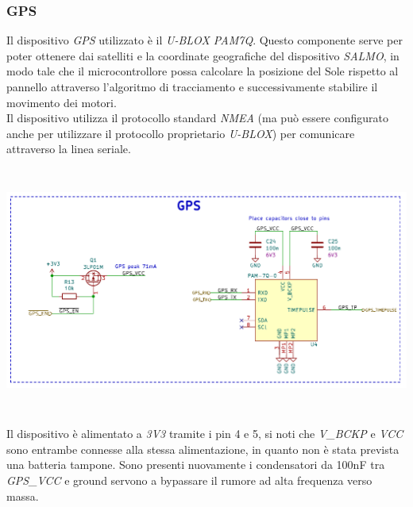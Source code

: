 \hypertarget{gps}{%
\subsubsection{\texorpdfstring{\hfill\break
\hfill\break
GPS }{  GPS }}\label{gps}}

Il dispositivo \emph{GPS} utilizzato è il \emph{U-BLOX PAM7Q}. Questo
componente serve per poter ottenere dai satelliti e la coordinate
geografiche del dispositivo \emph{SALMO}, in modo tale che il
microcontrollore possa calcolare la posizione del Sole rispetto al
pannello attraverso l'algoritmo di tracciamento e successivamente
stabilire il movimento dei motori.\\
Il dispositivo utilizza il protocollo standard \emph{NMEA} (ma può
essere configurato anche per utilizzare il protocollo proprietario
\emph{U-BLOX}) per comunicare attraverso la linea seriale.

\begin{center}
\includegraphics[width=6.5in,height=3.19444in]{figures/image26.png}
\captionsetup{type=figure}
\end{center}

Il dispositivo è alimentato a \emph{3V3} tramite i pin 4 e 5, si noti
che \emph{V\_BCKP} e \emph{VCC} sono entrambe connesse alla stessa
alimentazione, in quanto non è stata prevista una batteria tampone. Sono
presenti nuovamente i condensatori da 100nF tra \emph{GPS\_VCC} e ground
servono a bypassare il rumore ad alta frequenza verso massa.

